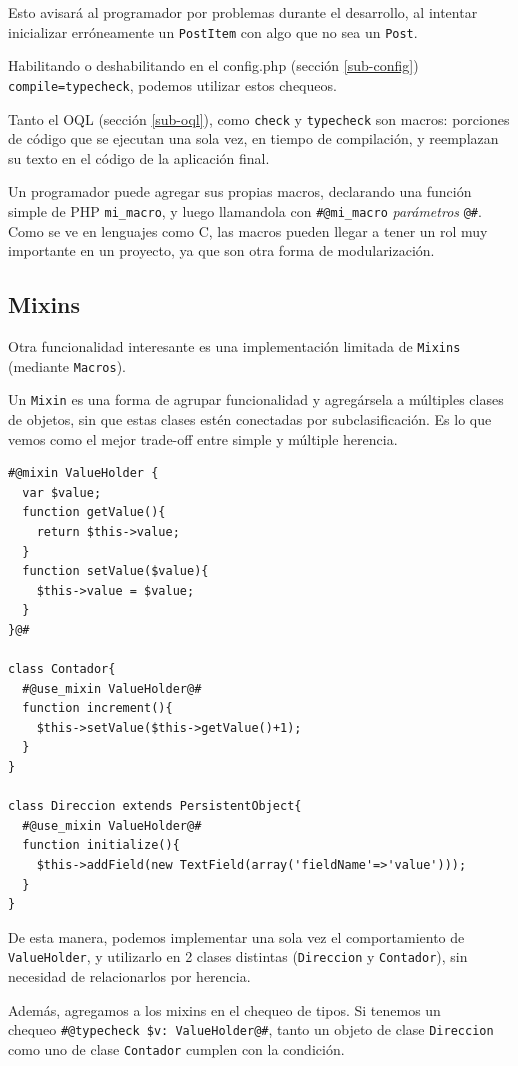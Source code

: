 Esto avisará al programador por problemas durante el desarrollo, al intentar inicializar erróneamente un \verb"PostItem" con algo que no sea un \verb'Post'.

Habilitando o deshabilitando en el config.php (sección \ref{sub-config}) \verb'compile=typecheck', podemos utilizar estos chequeos.

Tanto el OQL (sección \ref{sub-oql}), como \verb'check' y \verb'typecheck' son macros: porciones de código que se ejecutan una sola vez, en tiempo de compilación, y reemplazan su texto en el código de la aplicación final.

Un programador puede agregar sus propias macros, declarando una función simple de PHP \verb"mi_macro", y luego llamandola con \verb"#@mi_macro" {\it parámetros} \verb"@#". Como se ve en lenguajes como C, las macros pueden llegar a tener un rol muy importante en un proyecto, ya que son otra forma de modularización.

\subsection{Mixins}
\label{sub-mixins}
Otra funcionalidad interesante es una implementación limitada de \verb"Mixins" (mediante \verb"Macros").

Un \verb"Mixin" es una forma de agrupar funcionalidad y agregársela a múltiples clases de objetos, sin que estas clases estén conectadas por subclasificación. Es lo que vemos como el mejor trade-off entre simple y múltiple herencia.

\begin{verbatim}
#@mixin ValueHolder {
  var $value;
  function getValue(){
    return $this->value;
  }
  function setValue($value){
    $this->value = $value;
  }
}@#

class Contador{
  #@use_mixin ValueHolder@#
  function increment(){
    $this->setValue($this->getValue()+1);
  }
}

class Direccion extends PersistentObject{
  #@use_mixin ValueHolder@#
  function initialize(){
    $this->addField(new TextField(array('fieldName'=>'value')));
  }
}

\end{verbatim}

De esta manera, podemos implementar una sola vez el comportamiento de \verb'ValueHolder', y utilizarlo en 2 clases distintas (\verb"Direccion" y \verb"Contador"), sin necesidad de relacionarlos por herencia.

Además, agregamos a los mixins en el chequeo de tipos. Si tenemos un \\ chequeo \verb"#@typecheck $v: ValueHolder@#", tanto un objeto de clase \verb"Direccion" como uno de clase \verb"Contador" cumplen con la condición.

